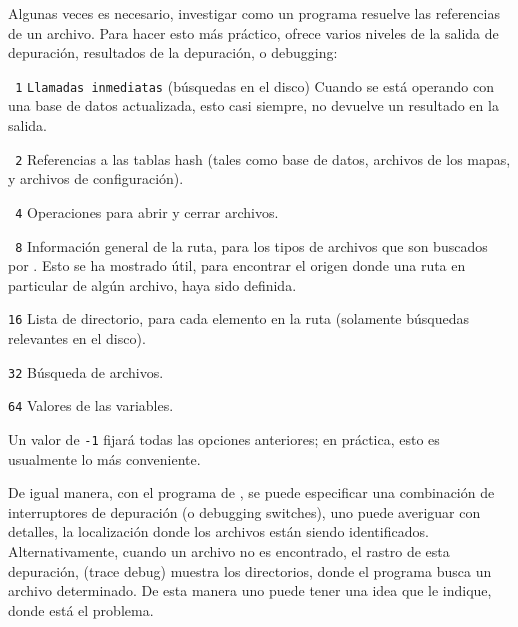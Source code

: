 \documentclass{article}
\begin{document}
Algunas veces es necesario, investigar como un programa resuelve las
referencias de un archivo. Para hacer esto más práctico, \KPS{} ofrece
varios niveles de la salida de depuración, resultados de la
depuración, o debugging:

 \begin{ttdescription} 
                    \item[\texttt{\ 1}] \texttt{Llamadas inmediatas}
                        (búsquedas en el disco) Cuando se está
                        operando con una base de datos 
                        actualizada, esto casi siempre, no devuelve un
                        resultado en la salida.
                    \item[\texttt{\ 2}] Referencias a las tablas hash
                        (tales como  base de datos,
                        archivos de los mapas, y archivos de
                        configuración).  
                    \item[\texttt{\ 4}] Operaciones para abrir y cerrar
                        archivos.  
                    \item[\texttt{\ 8}] Información general de la
                        ruta, para los tipos de archivos que son
                        buscados por \KPS{}. Esto se ha mostrado útil,
                        para encontrar el origen donde una ruta en
                        particular de algún archivo, haya sido
                        definida.  
                     \item[\texttt{16}] Lista de directorio, para cada
                         elemento en la ruta (solamente búsquedas
                         relevantes en el disco).  
                     \item[\texttt{32}] Búsqueda de archivos.  
                     \item[\texttt{64}] Valores de las variables.  
 \end{ttdescription}
 Un valor de \texttt{-1} fijará todas las opciones
 anteriores; en práctica, esto es usualmente lo más
 conveniente. 

 De igual manera, con el programa de , se
 puede especificar una combinación de interruptores de
 depuración (o debugging switches), uno puede averiguar con
 detalles, la localización donde los archivos están siendo
 identificados. Alternativamente, cuando un archivo no es
 encontrado, el rastro de esta depuración, (trace debug)
 muestra los directorios, donde el programa busca un archivo
 determinado. De esta manera uno puede tener una
 idea que le indique, donde está el problema.
\end{document}
